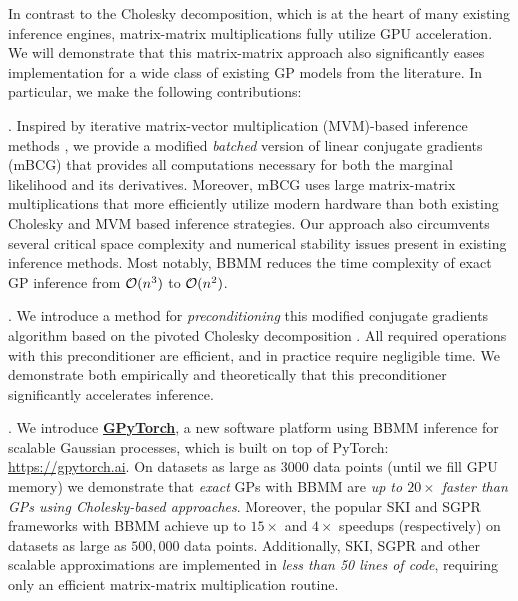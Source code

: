 In contrast to the Cholesky decomposition, which is at the heart of many existing inference engines, matrix-matrix multiplications fully utilize GPU acceleration.
We will demonstrate that this matrix-matrix approach also significantly eases implementation for a wide class of existing GP models from the literature.
In particular, we make the following contributions:

. Inspired by iterative matrix-vector multiplication (MVM)-based inference methods  \cite{cunningham2008fast,saatcci2012scalable,wilson2015kernel,wilson2015thoughts,dong2017scalable}, we provide a modified \emph{batched} version of linear conjugate gradients (mBCG) that provides all computations necessary for both the marginal likelihood and its derivatives.
Moreover, mBCG uses large matrix-matrix multiplications that more efficiently utilize modern hardware than both existing Cholesky and MVM based inference strategies.
Our approach also circumvents several critical space complexity and numerical stability issues present in existing inference methods.
Most notably, BBMM reduces the time complexity of exact GP inference from $\bigo{n^3}$ to $\bigo{n^2}$.

. We introduce a method for \emph{preconditioning} this modified conjugate gradients algorithm based on the pivoted Cholesky decomposition \cite{bach2013sharp,harbrecht2012low}.
All required operations with this preconditioner are efficient, and in practice require negligible time.
We demonstrate both empirically and theoretically that this preconditioner significantly accelerates inference.

. We introduce \textbf{\href{https://gpytorch.ai}{GPyTorch}}, a new software platform using BBMM inference for
scalable Gaussian processes, which is built on top of PyTorch: \url{https://gpytorch.ai}.
On datasets as large as $3000$ data points (until we fill GPU memory) we demonstrate that \emph{exact} GPs with BBMM are \emph{up to $20\times$ faster than GPs using Cholesky-based approaches}.
Moreover, the popular SKI \cite{wilson2015kernel} and SGPR \cite{titsias2009variational} frameworks with BBMM achieve up to $15\times$ and $4\times$ speedups (respectively) on datasets as large as $500,\!000$ data points.
Additionally, SKI, SGPR and other scalable approximations are implemented in \emph{less than 50 lines of code}, requiring only an efficient matrix-matrix multiplication routine.
